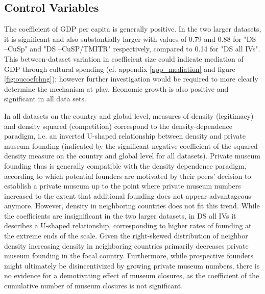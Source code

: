 \documentclass[11pt]{article}
\begin{document}
\subsection{Control Variables}
\label{app_controls}



The coefficient of GDP per capita is generally positive. 
In the two larger datasets, it is significant and also substantially larger with values of 0.79 and 0.88 for "DS --CuSp" and "DS --CuSP/TMITR" respectively, compared to 0.14 for "DS all IVs".
This between-dataset variation in coefficient size could indicate mediation of GDP through cultural spending (cf. appendix \ref{app_mediation} and figure \ref{fig:oucoefchng}); however further investigation would be required to more clearly determine the mechanism at play. 
Economic growth is also positive and significant in all data sets.





In all datasets on the country and global level, measures of density (legitimacy) and density squared (competition) correspond to the density-dependence paradigm, i.e. an inverted U-shaped relationship between density and private museum founding (indicated by the significant negative coefficient of the squared density measure on the country and global level for all datasets). 
Private museum founding thus is generally compatible with the density dependence paradigm, according to which potential founders are motivated by their peers' decision to establish a private museum up to the point where private museum numbers increased to the extent that additional founding does not appear advantageous anymore.
However, density in neighboring countries does not fit this trend.
While the coefficients are insignificant in the two larger datasets, in DS all IVs it describes a U-shaped relationship, corresponding to higher rates of founding at the extreme ends of the scale.
Given the right-skewed distribution of neighbor density increasing density in neighboring countries primarily decreases private museum founding in the focal country.
Furthermore, while prospective founders might ultimately be disincentivized by growing private museum numbers, there is no evidence for a demotivating effect of museum closures, as the coefficient of the cumulative number of museum closures is not significant.
\end{document}
